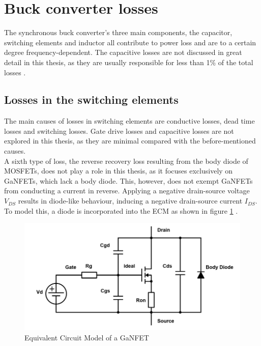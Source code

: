 \section{Buck converter losses}\label{sec:losses_in_bc}
The synchronous buck converter's three main components, the capacitor, switching elements and inductor all contribute to power loss and are to a certain degree frequency-dependent. The capacitive losses are not discussed in great detail in this thesis, as they are usually responsible for less than 1\% of the total losses \cite{An_Accurate_Approach_for_Calculating_the_Efficiency_of_a_SBC}.
\subsection{Losses in the switching elements}\label{sec:losses_in_switching_elements}
The main causes of losses in switching elements are conductive losses, dead time losses and switching losses. Gate drive losses and capacitive losses are not explored in this thesis, as they are minimal compared with the before-mentioned causes. \\
A sixth type of loss, the reverse recovery loss resulting from the body diode of \acp{MOSFET}, does not play a role in this thesis, as it focuses exclusively on \acp{GaNFET}, which lack a body diode. This, however, does not exempt \acp{GaNFET} from conducting a current in reverse. Applying a negative drain-source voltage $V_{DS}$ results in diode-like behaviour, inducing a negative drain-source current $I_{DS}$. To model this, a diode is incorporated into the \ac{ECM} as shown in figure \ref{fig:GaNFET_ECM} \cite{Does_GaN_Have_a_Body_Diode}.
\begin{figure}[H]
    \centering
    \includegraphics[width=0.75\linewidth]{Bilder//Kapitel2/GaNFET_ECM.png}
    \caption{Equivalent Circuit Model of a GaNFET}
    \label{fig:GaNFET_ECM}
\end{figure}
